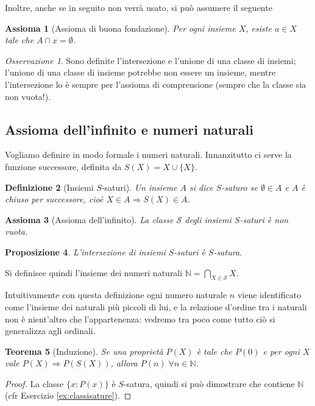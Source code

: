 \documentclass[a4paper,10pt,oneside]{article}
\theoremstyle{plain}
\newtheorem{mytheorem}{Teorema}[section]
\newtheorem{mydef}[mytheorem]{Definizione}
\newtheorem{myprop}[mytheorem]{Proposizione}
\newtheorem{myax}[mytheorem]{Assioma}
\theoremstyle{definition}
\theoremstyle{remark}
\newtheorem*{myobs}{Osservazione}
\begin{document}
Inoltre, anche se in seguito non verrà usato, si può assumere il seguente
\begin{myax}[Assioma di buona fondazione]
 Per ogni insieme $X$, esiste $a \in X$ tale che $A \cap x = \emptyset$.
\end{myax}

\begin{myobs}
 Sono definite l'intersezione e l'unione di una classe di insiemi; l'unione di una classe di insieme potrebbe non essere un insieme, mentre l'intersezione lo è sempre per l'assioma di comprensione (sempre che la classe sia non vuota!).
\end{myobs}


\subsection{Assioma dell'infinito e numeri naturali}

Vogliamo definire in modo formale i numeri naturali. Innanzitutto ci serve la funzione successore, definita da $S(X)=X\cup\{X\}$. 
\begin{mydef}[Insiemi $S$-saturi]
Un insieme $A$ si dice $S$-saturo se $\emptyset \in A$ e $A$ è chiuso per successore, cioè $X\in A \Rightarrow S(X)\in A$.
\end{mydef}
\begin{myax}[Assioma dell'infinito]
 La classe $\mathcal S$ degli insiemi $S$-saturi è non vuota.
\end{myax}

\begin{myprop}
 L'intersezione di insiemi $S$-saturi è $S$-satura.
\end{myprop}

Si definisce quindi l'insieme dei numeri naturali $\mathbb N = \bigcap_{X\in \mathcal S} X$. 

Intuitivamente con questa definizione ogni numero naturale $n$ viene identificato come l'insieme dei naturali più piccoli di lui, e la relazione d'ordine tra i naturali non è nient'altro che l'appartenenza: vedremo tra poco come tutto ciò si generalizza agli ordinali.

\begin{mytheorem}[Induzione]
 Se una proprietà $P(X)$ è tale che $P(0)$ e per ogni $X$ vale $P(X)\Rightarrow P(S(X))$, allora $P(n)\;\forall n\in \mathbb N$.
\end{mytheorem}
\begin{proof}
 La classe $\{x: P(x)\}$ è $S$-satura, quindi si può dimostrare che contiene $\mathbb N$ (cfr Esercizio \ref{ex:classisature}).
\end{proof}
\end{document}
